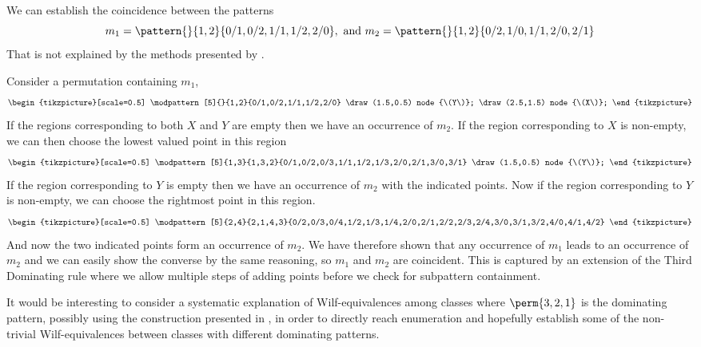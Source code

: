  \begin{example}
   We can establish the coincidence between the patterns
   \begin{equation*}
     m_1 = \pattern{}{1,2}{0/1,0/2,1/1,1/2,2/0}, \text{ and } m_2 = \pattern{}{1,2}{0/2,1/0,1/1,2/0,2/1}
   \end{equation*}
   That is not explained by the methods presented by \textcite{DBLP:journals/corr/ClaessonTU14}.

   Consider a permutation containing \(m_1\),
   \begin{equation*}
     \begin{tikzpicture}[scale=0.5]
         \modpattern[5]{}{1,2}{0/1,0/2,1/1,1/2,2/0}
         \draw (1.5,0.5) node {\(Y\)};
         \draw (2.5,1.5) node {\(X\)};
     \end{tikzpicture}
   \end{equation*}
   If the regions corresponding to both \(X\) and \(Y\) are empty then we have
   an occurrence of \(m_2\).
   If the region corresponding to \(X\) is non-empty, we can then choose
   the lowest valued point in this region
   \begin{equation*}
     \begin{tikzpicture}[scale=0.5]
         \modpattern[5]{1,3}{1,3,2}{0/1,0/2,0/3,1/1,1/2,1/3,2/0,2/1,3/0,3/1}
         \draw (1.5,0.5) node {\(Y\)};
     \end{tikzpicture}
   \end{equation*}
   If the region corresponding to \(Y\) is empty then we have an occurrence of
   \(m_2\) with the indicated points.
   Now if the region corresponding to \(Y\) is non-empty, we can choose the
   rightmost point in this region.
   \begin{equation*}
     \begin{tikzpicture}[scale=0.5]
         \modpattern[5]{2,4}{2,1,4,3}{0/2,0/3,0/4,1/2,1/3,1/4,2/0,2/1,2/2,2/3,2/4,3/0,3/1,3/2,4/0,4/1,4/2}
     \end{tikzpicture}
   \end{equation*}
   And now the two indicated points form an occurrence of \(m_2\).
   We have therefore shown that any occurrence of \(m_1\) leads to an occurrence of
   \(m_2\) and we can easily show the converse by the same reasoning, so \(m_1\)
   and \(m_2\) are coincident.
   This is captured by an extension of the Third Dominating rule where we allow
   multiple steps of adding points before we check for subpattern containment.
 \end{example}

It would be interesting to consider a systematic explanation of Wilf-equivalences among classes
where \(\perm{3,2,1}\) is the dominating pattern, possibly using the  construction presented in
\textcite[Sec.~12]{2015arXiv151203226B}, in order to directly reach enumeration and hopefully establish
some of the non-trivial Wilf-equivalences between classes with different dominating patterns.
